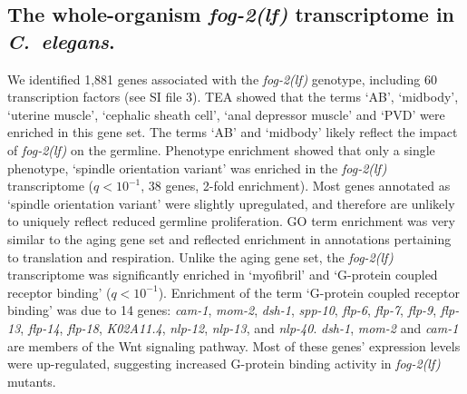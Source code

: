 \documentclass[9pt,twocolumn,twoside]{gsajnl}
\newcommand{\cel}{\emph{C.~elegans}}
\newcommand{\fog}{\emph{\mbox{fog-2(lf)}}}
\newcommand{\gene}[1]{\emph{\mbox{#1}}}
\newcommand{\fogn}{1,881}
\newcommand{\tffog}{60}
\begin{document}
\subsection{The whole-organism \fog{} transcriptome in \cel{}.}
We identified \fogn{} genes associated with the \fog{} genotype, including
\tffog{} transcription factors (see SI file 3). TEA showed that the terms `AB',
`midbody', `uterine muscle', `cephalic sheath cell', `anal depressor muscle' and
`PVD' were enriched in this gene set. The terms `AB' and `midbody' likely reflect
the impact of \fog{} on the germline.
Phenotype enrichment showed that only a single phenotype, `spindle orientation
variant' was enriched in the \fog{} transcriptome ($q<10^{-1}$, 38 genes, 2-fold
enrichment). Most genes annotated as `spindle orientation variant' were
slightly upregulated, and therefore are unlikely to uniquely reflect reduced
germline proliferation. GO term enrichment was very similar to the aging gene
set and reflected enrichment in annotations pertaining to translation and
respiration. Unlike the aging gene set, the \fog{} transcriptome was
significantly enriched in `myofibril' and `G-protein coupled receptor binding'
($q<10^{-1}$). Enrichment of the term `G-protein coupled receptor binding' was
due to 14 genes: \gene{cam-1}, \gene{mom-2},  \gene{dsh-1}, \gene{spp-10},
\gene{flp-6}, \gene{flp-7}, \gene{flp-9}, \gene{flp-13}, \gene{flp-14},
\gene{flp-18},
\gene{K02A11.4}, \gene{nlp-12}, \gene{nlp-13}, and \gene{nlp-40}.
\gene{dsh-1},
\gene{mom-2} and \gene{cam-1} are members of the Wnt signaling pathway.
Most of these genes' expression levels were up-regulated, suggesting increased
G-protein binding activity in \fog{} mutants.
\end{document}
